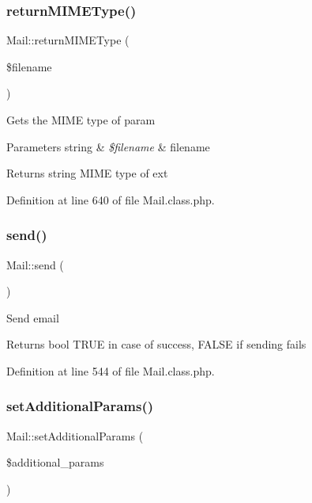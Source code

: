 \subsubsection{\texorpdfstring{return\+M\+I\+M\+E\+Type()}{returnMIMEType()}}
{\footnotesize\ttfamily Mail\+::return\+M\+I\+M\+E\+Type (\begin{DoxyParamCaption}\item[{}]{\$filename }\end{DoxyParamCaption})}

Gets the M\+I\+ME type of param


\begin{DoxyParams}[1]{Parameters}
string & {\em \$filename} & filename \\
\hline
\end{DoxyParams}
\begin{DoxyReturn}{Returns}
string M\+I\+ME type of ext 
\end{DoxyReturn}


Definition at line 640 of file Mail.\+class.\+php.

\mbox{\label{classMail_a6520941b529c223c1b59ec7544f7f7d6}} 
\subsubsection{\texorpdfstring{send()}{send()}}
{\footnotesize\ttfamily Mail\+::send (\begin{DoxyParamCaption}{ }\end{DoxyParamCaption})}

Send email

\begin{DoxyReturn}{Returns}
bool T\+R\+UE in case of success, F\+A\+L\+SE if sending fails 
\end{DoxyReturn}


Definition at line 544 of file Mail.\+class.\+php.

\mbox{\label{classMail_abea35dd9f29bbebacfc79ec2c7852799}} 
\subsubsection{\texorpdfstring{set\+Additional\+Params()}{setAdditionalParams()}}
{\footnotesize\ttfamily Mail\+::set\+Additional\+Params (\begin{DoxyParamCaption}\item[{}]{\$additional\+\_\+params }\end{DoxyParamCaption})}

